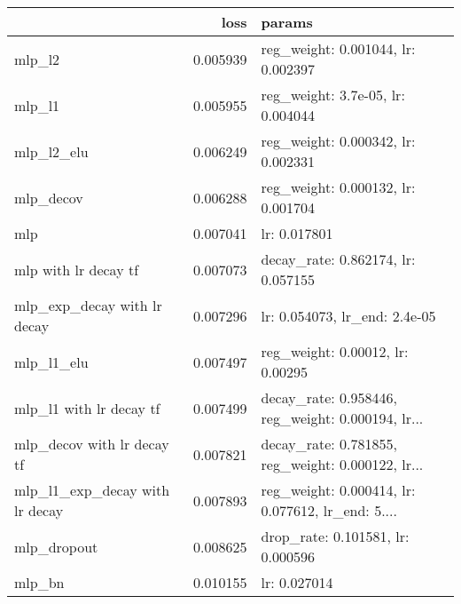 \begin{tabular}{lrl}
\toprule
{} &      loss &                                             params \\
\midrule
mlp\_l2                         &  0.005939 &                 reg\_weight: 0.001044, lr: 0.002397 \\
mlp\_l1                         &  0.005955 &                  reg\_weight: 3.7e-05, lr: 0.004044 \\
mlp\_l2\_elu                     &  0.006249 &                 reg\_weight: 0.000342, lr: 0.002331 \\
mlp\_decov                      &  0.006288 &                 reg\_weight: 0.000132, lr: 0.001704 \\
mlp                            &  0.007041 &                                       lr: 0.017801 \\
mlp with lr decay tf           &  0.007073 &                 decay\_rate: 0.862174, lr: 0.057155 \\
mlp\_exp\_decay with lr decay    &  0.007296 &                      lr: 0.054073, lr\_end: 2.4e-05 \\
mlp\_l1\_elu                     &  0.007497 &                   reg\_weight: 0.00012, lr: 0.00295 \\
mlp\_l1 with lr decay tf        &  0.007499 &  decay\_rate: 0.958446, reg\_weight: 0.000194, lr... \\
mlp\_decov with lr decay tf     &  0.007821 &  decay\_rate: 0.781855, reg\_weight: 0.000122, lr... \\
mlp\_l1\_exp\_decay with lr decay &  0.007893 &  reg\_weight: 0.000414, lr: 0.077612, lr\_end: 5.... \\
mlp\_dropout                    &  0.008625 &                  drop\_rate: 0.101581, lr: 0.000596 \\
mlp\_bn                         &  0.010155 &                                       lr: 0.027014 \\
\bottomrule
\end{tabular}
